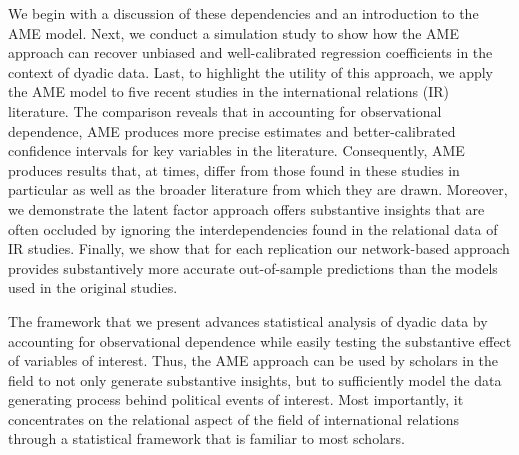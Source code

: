 We begin with a discussion of these dependencies and an introduction to the AME model. Next, we conduct a simulation study to show how the AME approach can recover unbiased and well-calibrated regression coefficients in the context of dyadic data. Last, to highlight the utility of this approach, we apply the AME model to five recent studies in the international relations (IR) literature. The comparison reveals that in accounting for observational dependence, AME produces more precise estimates and better-calibrated confidence intervals for key variables in the literature. Consequently, AME produces results that, at times, differ from those found in these studies in particular as well as the broader literature from which they are drawn. Moreover, we demonstrate the latent factor approach offers substantive insights that are often occluded by ignoring the interdependencies found in the relational data of IR studies. Finally, we show that for each replication our network-based approach provides substantively more accurate out-of-sample predictions than the models used in the original studies. 

The framework that we present advances statistical analysis of dyadic data by accounting for observational dependence while easily testing the substantive effect of variables of interest. Thus, the AME approach can be used by scholars in the field to not only generate substantive insights, but to sufficiently model the data generating process behind political events of interest. Most importantly, it concentrates on the relational aspect of the field of international relations through a statistical framework that is familiar to most scholars.